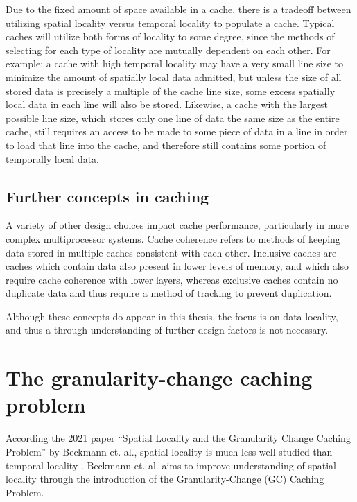 \documentclass[12pt,twoside]{reedthesis}
\begin{document}
	Due to the fixed amount of space available in a cache, there is a tradeoff between utilizing spatial locality versus temporal locality to populate a cache. Typical caches will utilize both forms of locality to some degree, since the methods of selecting for each type of locality are mutually dependent on each other. For example: a cache with high temporal locality may have a very small line size to minimize the amount of spatially local data admitted, but unless the size of all stored data is precisely a multiple of the cache line size, some excess spatially local data in each line will also be stored. Likewise, a cache with the largest possible line size, which stores only one line of data the same size as the entire cache, still requires an access to be made to some piece of data in a line in order to load that line into the cache, and therefore still contains some portion of temporally local data.

	\subsection*{Further concepts in caching}

	A variety of other design choices impact cache performance, particularly in more complex multiprocessor systems. Cache coherence refers to methods of keeping data stored in multiple caches consistent with each other. Inclusive caches are caches which contain data also present in lower levels of memory, and which also require cache coherence with lower layers, whereas exclusive caches contain no duplicate data and thus require a method of tracking to prevent duplication.
	
	Although these concepts do appear in this thesis, the focus is on data locality, and thus a through understanding of further design factors is not necessary.


\section{The granularity-change caching problem}

According the 2021 paper ``Spatial Locality and the Granularity Change Caching Problem'' by Beckmann et. al., spatial locality is much less well-studied than temporal locality  \cite{beckmann}. Beckmann et. al. aims to improve understanding of spatial locality through the introduction of the Granularity-Change (GC) Caching Problem.
\end{document}

